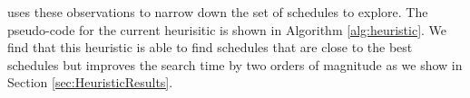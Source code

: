 \Treebeard{} uses these observations to narrow down the set of schedules to explore. 
The pseudo-code for the current heurisitic is shown in Algorithm \ref{alg:heuristic}.
We find that this heuristic is able to find schedules that are close to the best schedules
but improves the search time by two orders of magnitude as we show in Section \ref{sec:HeuristicResults}.

